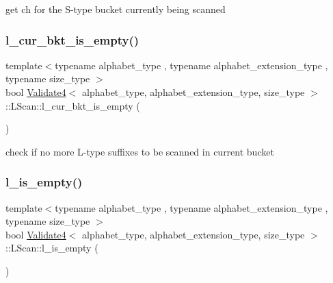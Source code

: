 get ch for the S-\/type bucket currently being scanned 

\mbox{\label{struct_validate4_1_1_l_scan_ae76d58363b02ac96925becbbdbe02977}} 
\subsubsection{\texorpdfstring{l\+\_\+cur\+\_\+bkt\+\_\+is\+\_\+empty()}{l\_cur\_bkt\_is\_empty()}}
{\footnotesize\ttfamily template$<$typename alphabet\+\_\+type , typename alphabet\+\_\+extension\+\_\+type , typename size\+\_\+type $>$ \\
bool \hyperlink{class_validate4}{Validate4}$<$ alphabet\+\_\+type, alphabet\+\_\+extension\+\_\+type, size\+\_\+type $>$\+::L\+Scan\+::l\+\_\+cur\+\_\+bkt\+\_\+is\+\_\+empty (\begin{DoxyParamCaption}{ }\end{DoxyParamCaption})\hspace{0.3cm}{\ttfamily [inline]}}



check if no more L-\/type suffixes to be scanned in current bucket 

\mbox{\label{struct_validate4_1_1_l_scan_a22b7a0b8c64f17da5a815ddaf8619ebb}} 
\subsubsection{\texorpdfstring{l\+\_\+is\+\_\+empty()}{l\_is\_empty()}}
{\footnotesize\ttfamily template$<$typename alphabet\+\_\+type , typename alphabet\+\_\+extension\+\_\+type , typename size\+\_\+type $>$ \\
bool \hyperlink{class_validate4}{Validate4}$<$ alphabet\+\_\+type, alphabet\+\_\+extension\+\_\+type, size\+\_\+type $>$\+::L\+Scan\+::l\+\_\+is\+\_\+empty (\begin{DoxyParamCaption}{ }\end{DoxyParamCaption})\hspace{0.3cm}{\ttfamily [inline]}}



